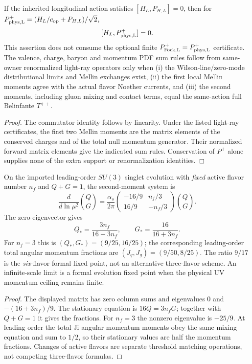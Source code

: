 \documentclass[12pt,a4paper]{article}
\begin{document}
\begin{proposition}
\label{p11:prop:v350-light-ray-owner-qualification}
If the inherited longitudinal action satisfies
$[H_L,P_{H,L}]=0$, then for
$P^+_{\rm phys,L}=(H_L/c_{\rm op}+P_{H,L})/\sqrt2$,
\[
 [H_L,P^+_{\rm phys,L}]=0.
\]
This assertion does not consume the optional finite
$P^+_{\rm Fock,L}=P^+_{\rm phys,L}$ certificate.
The valence, charge, baryon and momentum PDF sum rules follow from
same-owner renormalized light-ray operators only when (i) the
Wilson-line/zero-mode distributional limits and Mellin exchanges
exist, (ii) the first local Mellin moments agree with the actual
flavor Noether currents, and (iii) the second moments, including
gluon mixing and contact terms, equal the same-action full
Belinfante $T^{++}$.
\end{proposition}
\begin{proof}
The commutator identity follows by linearity. Under the listed
light-ray certificates, the first two Mellin moments are the
matrix elements of the conserved charges and of the total null
momentum generator. Their normalized forward matrix elements
give the indicated sum rules. Conservation of $P^+$ alone
supplies none of the extra support or renormalization identities.
\end{proof}

\begin{theorem}
\label{p11:thm:v350-dglap-fixed-nf-correction}
On the imported leading-order $SU(3)$ singlet evolution with
\emph{fixed} active flavor number $n_f$ and
$Q+G=1$, the second-moment system is
\[
 \frac{d}{d\ln\mu^2}\binom QG
 =\frac{\alpha_s}{2\pi}
 \begin{pmatrix}-16/9&n_f/3\\16/9&-n_f/3\end{pmatrix}
 \binom QG.
\]
The zero eigenvector gives
\[
 \boxed{Q_*=\frac{3n_f}{16+3n_f},\qquad
 G_*=\frac{16}{16+3n_f}.}
\]
For $n_f=3$ this is $(Q_*,G_*)=(9/25,16/25)$;
the corresponding leading-order total angular momentum fractions
are $(J_q,J_g)=(9/50,8/25)$.
The ratio $9/17$ is the \emph{six}-flavor formal fixed point,
not an alternative three-flavor scheme. An infinite-scale limit
is a formal evolution fixed point when the physical UV
momentum ceiling remains finite.
\end{theorem}
\begin{proof}
The displayed matrix has zero column sums and eigenvalues
$0$ and $-(16+3n_f)/9$. The stationary equation is
$16Q=3n_fG$; together with $Q+G=1$ it gives the fractions.
For $n_f=3$ the nonzero eigenvalue is $-25/9$. At leading
order the total Ji angular momentum moments obey the same
mixing equation and sum to $1/2$, so their stationary values
are half the momentum fractions. Changes of active flavors
are separate threshold matching operations, not competing
three-flavor formulas.
\end{proof}
\end{document}
